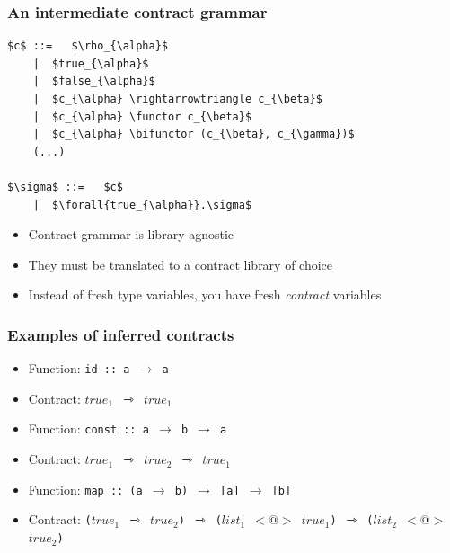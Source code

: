 \documentclass[]{beamer}
\makeatletter
\newcommand{\functor}{<\!\!\!@\!\!\!>}
\newcommand{\bifunctor}{<\!\!\!@\!\!@\!\!\!>}
\makeatother
\begin{document}
\begin{frame}[fragile]
\frametitle{An intermediate contract grammar}

\begin{lstlisting}[mathescape]
$c$ ::=   $\rho_{\alpha}$
    |  $true_{\alpha}$
    |  $false_{\alpha}$
    |  $c_{\alpha} \rightarrowtriangle c_{\beta}$
    |  $c_{\alpha} \functor c_{\beta}$
    |  $c_{\alpha} \bifunctor (c_{\beta}, c_{\gamma})$
    (...)
    
$\sigma$ ::=   $c$
    |  $\forall{true_{\alpha}}.\sigma$
\end{lstlisting}

\begin{itemize}
	\item Contract grammar is library-agnostic
	\item They must be translated to a contract library of choice
	\item Instead of fresh type variables, you have fresh \textit{contract} variables
\end{itemize}

\end{frame}

\begin{frame}[fragile]
\frametitle{Examples of inferred contracts}

\begin{itemize}
	\item Function: \texttt{id :: a $\rightarrow$ a}
	\item Contract: \texttt{$true_1$ $\rightarrowtriangle$ $true_1$}
\end{itemize}

\begin{itemize}
	\item Function: \texttt{const :: a $\rightarrow$ b $\rightarrow$ a}
	\item Contract: \texttt{$true_1$ $\rightarrowtriangle$ $true_2$ $\rightarrowtriangle$ $true_1$}
\end{itemize}

\begin{itemize}
	\item Function: \texttt{map :: (a $\rightarrow$ b) $\rightarrow$ [a] $\rightarrow$ [b]}
	\item Contract: \texttt{($true_1$ $\rightarrowtriangle$ $true_2$) $\rightarrowtriangle$ ($list_1$ $\functor$ $true_1$) $\rightarrowtriangle$ ($list_2$ $\functor$ $true_2$)}
\end{itemize}

\end{frame}
\end{document}
